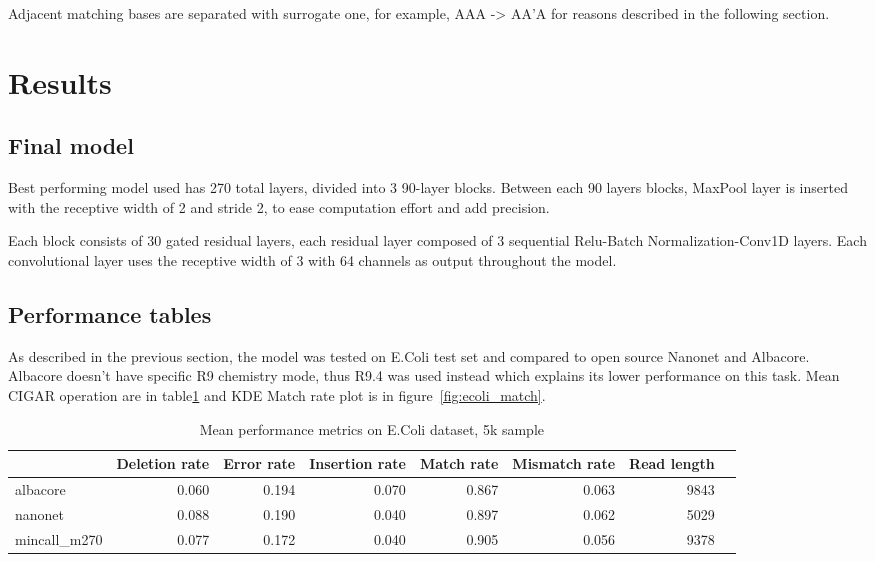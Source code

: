 \documentclass[runningheads,a4paper]{llncs}
\begin{document}
Adjacent matching bases are separated with surrogate one, for example, AAA -> AA'A for reasons described in the following section.


\section{Results}

\subsection{Final model}

Best performing model used has 270 total layers, divided into 3 90-layer blocks. Between each 90 layers blocks, MaxPool layer is inserted with the receptive width of 2 and stride 2, to ease computation effort and add precision.

Each block consists of 30 gated residual layers, each residual layer composed of 3 sequential Relu-Batch Normalization-Conv1D layers. Each convolutional layer uses the receptive width of 3 with 64 channels as output throughout the model.

\subsection{Performance tables}

As described in the previous section, the model was tested on E.Coli test set and compared to open source Nanonet and Albacore. Albacore doesn't have specific R9 chemistry mode, thus R9.4 was used instead which explains its lower performance on this task. Mean CIGAR operation are in table\ref{table:1} and KDE Match rate plot is in figure~\ref{fig:ecoli_match}.


\begin{table}[h!]
\centering
\begin{tabular}{lrrrrrrr}
\toprule
{} &  Deletion rate &  Error rate &  Insertion rate &  Match rate &  Mismatch rate &  Read length\\
\midrule
albacore     &       0.060 &    0.194 &        0.070 &    0.867 &       0.063 &  9843 \\
nanonet      &       0.088 &    0.190 &        0.040 &    0.897 &       0.062 &  5029 \\
mincall\_m270 &       0.077 &    0.172 &        0.040 &   0.905 &       0.056 &  9378 \\
\bottomrule
\end{tabular}

\caption{Mean performance metrics on E.Coli dataset, 5k sample}
\label{table:1}
\end{table}
\end{document}
